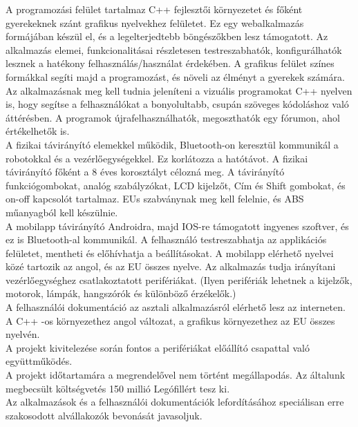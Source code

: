 \documentclass{article}
\begin{document}
A programozási felület tartalmaz C++ fejlesztői környezetet és főként gyerekeknek szánt grafikus nyelvekhez felületet. Ez egy webalkalmazás formájában készül el, és a legelterjedtebb böngészőkben lesz támogatott. Az alkalmazás elemei, funkcionalitásai részletesen testreszabhatók, konfigurálhatók lesznek a hatékony felhasználás/használat érdekében. A grafikus felület színes formákkal segíti majd a programozást, és növeli az élményt a gyerekek számára. Az alkalmazásnak meg kell tudnia jeleníteni a vizuális programokat C++ nyelven is, hogy segítse a felhasználókat a bonyolultabb, csupán szöveges kódoláshoz való áttérésben.
A programok újrafelhasználhatók, megoszthatók egy fórumon, ahol értékelhetők is.\\

A fizikai távirányító elemekkel működik, Bluetooth-on keresztül kommunikál a robotokkal és a vezérlőegységekkel. Ez korlátozza a hatótávot. A fizikai távirányító főként a 8 éves korosztályt célozná meg. A távirányító funkciógombokat, analóg szabályzókat, LCD kijelzőt, Cím és Shift gombokat,  és on-off kapcsolót tartalmaz. EUs szabványnak meg kell felelnie, és ABS műanyagból kell készülnie.\\

A mobilapp távirányító Androidra, majd IOS-re támogatott ingyenes szoftver, és ez is Bluetooth-al kommunikál. A felhasználó testreszabhatja az applikációs felületet, mentheti és előhívhatja a beállításokat. A mobilapp elérhető nyelvei közé tartozik az angol, és az EU összes nyelve. Az alkalmazás tudja irányítani vezérlőegységhez csatlakoztatott perifériákat. (Ilyen perifériák lehetnek a kijelzők, motorok, lámpák, hangszórók és különböző érzékelők.)\\

A felhasználói dokumentáció az asztali alkalmazásról elérhető lesz az interneten. A C++ -os környezethez angol változat, a grafikus környezethez az EU összes nyelvén.\\

A projekt kivitelezése során fontos a perifériákat előállító csapattal való együttműködés.\\

A projekt időtartamára a megrendelővel nem történt megállapodás. 
Az általunk megbecsült költségvetés 150 millió Legófillért tesz ki.\\

Az alkalmazások és a felhasználói dokumentációk lefordításához speciálisan erre szakosodott alvállakozók bevonását javasoljuk.\\
\end{document}
